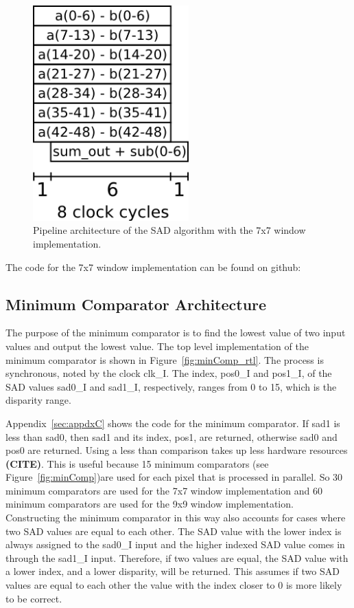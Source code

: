 \begin{figure}[h]
	\begin{center}
		\includegraphics[width=60mm]{figures/sadPipeline7x7.png}
		\captionfonts
		\caption{Pipeline architecture of the SAD algorithm with the 7x7 window implementation.}
		\label{fig:sadPipe7x7}
	\end{center}
\end{figure}

The code for the 7x7 window implementation can be found on github:
\\

\subsection{Minimum Comparator Architecture}

The purpose of the minimum comparator is to find the lowest value of two input values and output the lowest value. The top level implementation of the minimum comparator is shown in Figure~\ref{fig:minComp_rtl}. The process is synchronous, noted by the clock clk\_I. The index, pos0\_I and pos1\_I, of the SAD values sad0\_I and sad1\_I, respectively, ranges from 0 to 15, which is the disparity range. 

Appendix~\ref{sec:appdxC} shows the code for the minimum comparator. If sad1 is less than sad0, then sad1 and its index, pos1, are returned, otherwise sad0 and pos0 are returned. Using a less than comparison takes up less hardware resources \textbf{(CITE)}. This is useful because 15 minimum comparators (see Figure~\ref{fig:minComp})are used for each pixel that is processed in parallel. So 30 minimum comparators are used for the 7x7 window implementation and 60 minimum comparators are used for the 9x9 window implementation. Constructing the minimum comparator in this way also accounts for cases where two SAD values are equal to each other. The SAD value with the lower index is always assigned to the sad0\_I input and the higher indexed SAD value comes in through the sad1\_I input. Therefore, if two values are equal, the SAD value with a lower index, and a lower disparity, will be returned. This assumes if two SAD values are equal to each other the value with the index closer to 0 is more likely to be correct.

